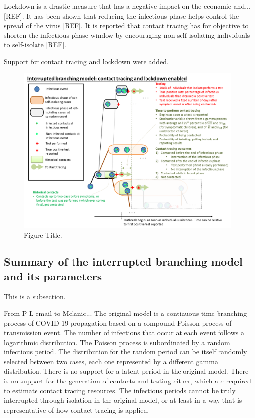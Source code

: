 \documentclass[sr]{drdc-report}
\begin{document}
Lockdown is a drastic measure that has a negative impact on the economie and... [REF]. It has been shown that reducing the infectious phase helps control the spread of the virus [REF]. It is reported that contact tracing has for objective to shorten the infectious phase window by encouraging non-self-isolating individuals to self-isolate [REF]. 

Support for contact tracing and lockdown were added. 

\begin{figure}
  \includegraphics[width=0.99\textwidth, keepaspectratio=true]{figures/InterruptedBranchingModel}
  \caption{Figure Title.}\label{fig_branchingModel}
\end{figure}

\subsection{Summary of the interrupted branching model and its parameters}
This is a subsection.

From P-L email to Melanie...
The original model is a continuous time branching process of COVID-19 propagation based on a compound Poisson process of transmission event. The number of infections that occur at each event follows a logarithmic distribution. The Poisson process is subordinated by a random infectious period. The distribution for the random period can be itself randomly selected between two cases, each one represented by a different gamma distribution. There is no support for a latent period in the original model. There is no support for the generation of contacts and testing either, which are required to estimate contact tracing resources. The infectious periods cannot be truly interrupted through isolation in the original model, or at least in a way that is representative of how contact tracing is applied.
\end{document}

